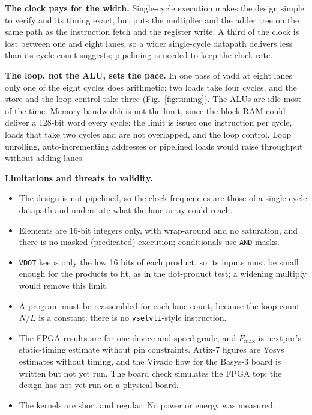 \documentclass[journal]{IEEEtran}
\begin{document}
\textbf{The clock pays for the width.} Single-cycle execution makes the design simple
to verify and its timing exact, but puts the multiplier and the adder tree on the same
path as the instruction fetch and the register write. A third of the clock is lost
between one and eight lanes, so a wider single-cycle datapath delivers less than its
cycle count suggests; pipelining is needed to keep the clock rate.

\textbf{The loop, not the ALU, sets the pace.} In one pass of vadd at eight lanes only
one of the eight cycles does arithmetic; two loads take four cycles, and the store and
the loop control take three (Fig.~\ref{fig:timing}). The ALUs are idle most of the time. Memory bandwidth is not the limit, since
the block RAM could deliver a 128-bit word every cycle; the limit is issue: one
instruction per cycle, loads that take two cycles and are not overlapped, and the loop
control. Loop unrolling, auto-incrementing addresses or pipelined loads would raise
throughput without adding lanes.

\textbf{Limitations and threats to validity.}
\begin{itemize}
\item The design is not pipelined, so the clock frequencies are those of a single-cycle
      datapath and understate what the lane array could reach.
\item Elements are 16-bit integers only, with wrap-around and no saturation, and there
      is no masked (predicated) execution; conditionals use \texttt{AND} masks.
\item \texttt{VDOT} keeps only the low 16 bits of each product, so its inputs must be
      small enough for the products to fit, as in the dot-product test; a widening
      multiply would remove this limit.
\item A program must be reassembled for each lane count, because the loop count
      $N/L$ is a constant; there is no \texttt{vsetvli}-style instruction.
\item The FPGA results are for one device and speed grade, and $F_{\max}$ is nextpnr's
      static-timing estimate without pin constraints. Artix-7 figures are Yosys
      estimates without timing, and the Vivado flow for the Basys-3 board is written but
      not yet run. The board check simulates the FPGA top; the design has not yet run on
      a physical board.
\item The kernels are short and regular. No power or energy was measured.
\end{itemize}
\end{document}
